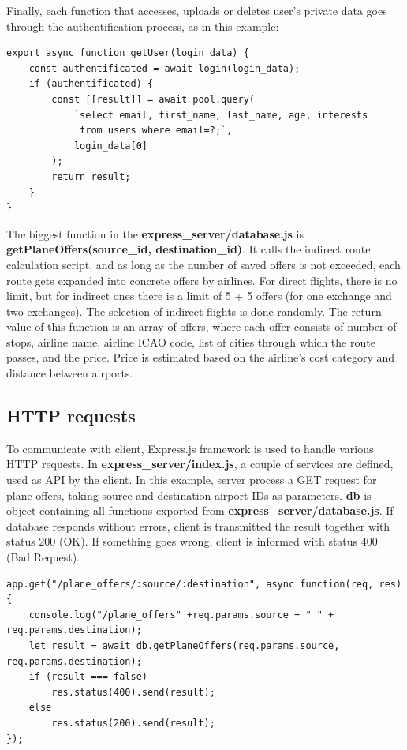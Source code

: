 \documentclass[12pt]{article}
\begin{document}
Finally, each function that accesses, uploads or deletes user's private data goes through the authentification process, as in this example:
\begin{verbatim}
export async function getUser(login_data) {
	const authentificated = await login(login_data);
	if (authentificated) {
		const [[result]] = await pool.query(
			`select email, first_name, last_name, age, interests
			 from users where email=?;`,	   
			login_data[0]
		);
		return result;
	}
}
\end{verbatim}

The biggest function in the \textbf{express\_server/database.js} is \textbf{getPlaneOffers(source\_id, destination\_id)}. It calls the indirect route calculation script, and as long as the number of saved offers is not exceeded, each route gets expanded into concrete offers by airlines. For direct flights, there is no limit, but for indirect ones there is a limit of 5 + 5 offers (for one exchange and two exchanges). The selection of indirect flights is done randomly. The return value of this function is an array of offers, where each offer consists of number of stops, airline name, airline ICAO code, list of cities through which the route passes, and the price. Price is estimated based on the airline's cost category and distance between airports.

\subsection{HTTP requests}
\label{sec:org211c1e1}
To communicate with client, Express.js framework is used to handle various HTTP requests. In \textbf{express\_server/index.js}, a couple of services are defined, used as API by the client. In this example, server process a GET request for plane offers, taking source and destination airport IDs as parameters. \textbf{db} is object containing all functions exported from \textbf{express\_server/database.js}. If database responds without errors, client is transmitted the result together with status 200 (OK). If something goes wrong, client is informed with status 400 (Bad Request).
\begin{verbatim}
app.get("/plane_offers/:source/:destination", async function(req, res) {
	console.log("/plane_offers" +req.params.source + " " + req.params.destination);
	let result = await db.getPlaneOffers(req.params.source, req.params.destination);
	if (result === false)
		res.status(400).send(result);
	else 
		res.status(200).send(result);
});
\end{verbatim}
\end{document}
